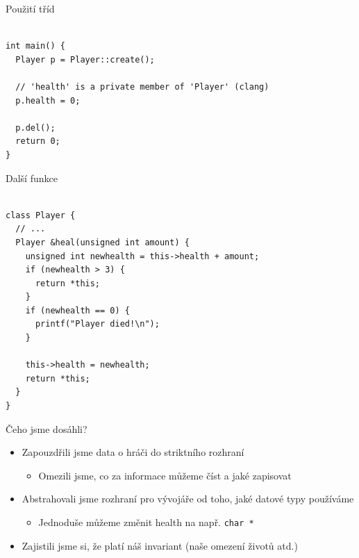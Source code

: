 \documentclass[aspectratio=1610]{beamer}
\begin{document}
\begin{frame}[fragile]{Použití tříd}

\begin{verbatim}

int main() {
  Player p = Player::create();

  // 'health' is a private member of 'Player' (clang)
  p.health = 0;

  p.del();
  return 0;
}

\end{verbatim}

\end{frame}

\begin{frame}[fragile]{Další funkce}

\begin{verbatim}

class Player {
  // ...
  Player &heal(unsigned int amount) {
    unsigned int newhealth = this->health + amount;
    if (newhealth > 3) {
      return *this;
    }
    if (newhealth == 0) {
      printf("Player died!\n");
    }

    this->health = newhealth;
    return *this;
  }
}
\end{verbatim}

\end{frame}

\begin{frame}{Čeho jsme dosáhli?}

\begin{itemize}
  \item Zapouzdřili jsme data o hráči do striktního rozhraní
    \begin{itemize}
      \item Omezili jsme, co za informace můžeme číst a jaké zapisovat
    \end{itemize}
  \item Abstrahovali jsme rozhraní pro vývojáře od toho, jaké datové typy používáme
    \begin{itemize}
      \item Jednoduše můžeme změnit health na např. \texttt{char *}
    \end{itemize}
  \item Zajistili jsme si, že platí náš invariant (naše omezení životů atd.)
\end{itemize}

\end{frame}
\end{document}
